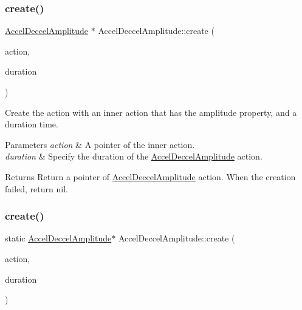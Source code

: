 \mbox{\label{classAccelDeccelAmplitude_a1edfd6faddca0ae76a2f336a9eeaff14}} 
\subsubsection{\texorpdfstring{create()}{create()}\hspace{0.1cm}{\footnotesize\ttfamily [1/2]}}
{\footnotesize\ttfamily \hyperlink{classAccelDeccelAmplitude}{Accel\+Deccel\+Amplitude} $\ast$ Accel\+Deccel\+Amplitude\+::create (\begin{DoxyParamCaption}\item[{\hyperlink{classAction}{Action} $\ast$}]{action,  }\item[{float}]{duration }\end{DoxyParamCaption})\hspace{0.3cm}{\ttfamily [static]}}



Create the action with an inner action that has the amplitude property, and a duration time. 


\begin{DoxyParams}{Parameters}
{\em action} & A pointer of the inner action. \\
\hline
{\em duration} & Specify the duration of the \hyperlink{classAccelDeccelAmplitude}{Accel\+Deccel\+Amplitude} action. \\
\hline
\end{DoxyParams}
\begin{DoxyReturn}{Returns}
Return a pointer of \hyperlink{classAccelDeccelAmplitude}{Accel\+Deccel\+Amplitude} action. When the creation failed, return nil. 
\end{DoxyReturn}
\mbox{\label{classAccelDeccelAmplitude_aa9d4b4da47ccad833b5413078679a6e4}} 
\subsubsection{\texorpdfstring{create()}{create()}\hspace{0.1cm}{\footnotesize\ttfamily [2/2]}}
{\footnotesize\ttfamily static \hyperlink{classAccelDeccelAmplitude}{Accel\+Deccel\+Amplitude}$\ast$ Accel\+Deccel\+Amplitude\+::create (\begin{DoxyParamCaption}\item[{\hyperlink{classAction}{Action} $\ast$}]{action,  }\item[{float}]{duration }\end{DoxyParamCaption})\hspace{0.3cm}{\ttfamily [static]}}



